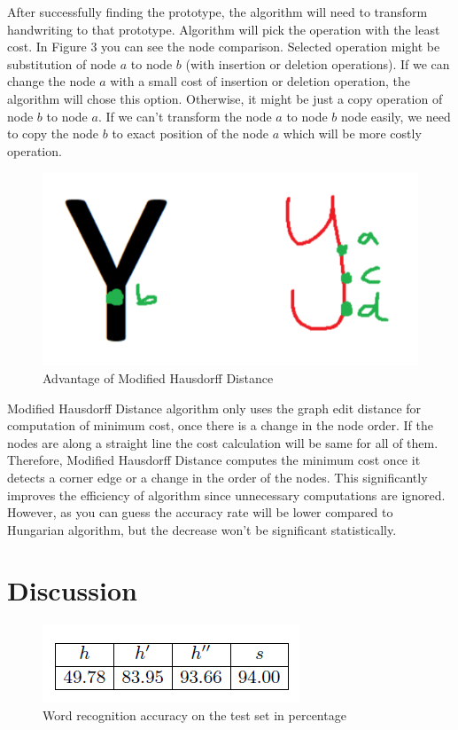 \documentclass{article}
\begin{document}
After successfully finding the prototype, the algorithm will need to transform handwriting to that prototype. Algorithm will pick the operation with the least cost. In Figure 3 you can see the node comparison. Selected operation might be substitution of node $a$ to node $b$ (with insertion or deletion operations). If we can change the node $a$ with a small cost of insertion or deletion operation, the algorithm will chose this option. Otherwise, it might be just a copy operation of node $b$ to node $a$. If we can't transform the node $a$ to node $b$ node easily, we need to copy the node $b$ to exact position of the node $a$ which will be more costly operation.


\begin{center}
\end{center}
\begin{figure}[h]
    \centering
    \includegraphics[width = .5\textwidth]{Images/yeni.png}
    \caption{Advantage of Modified Hausdorff Distance}
\end{figure}

Modified Hausdorff Distance algorithm only uses the graph edit distance for computation of minimum cost, once there is a change in the node order. If the nodes are along a straight line the cost calculation will be same for all of them. Therefore, Modified Hausdorff Distance computes the minimum cost once it detects a corner edge or a change in the order of the nodes. This significantly improves the efficiency of algorithm since unnecessary computations are ignored. However, as you can guess the accuracy rate will be lower compared to Hungarian algorithm, but the decrease won't be significant statistically.

\section{Discussion}

\begin{center}
\end{center}
\begin{figure}[h]
    \centering
    \includegraphics[width = .4\textwidth]{Images/test.png}
    \caption{Word recognition accuracy on the test set in percentage}
\end{figure}
\end{document}

